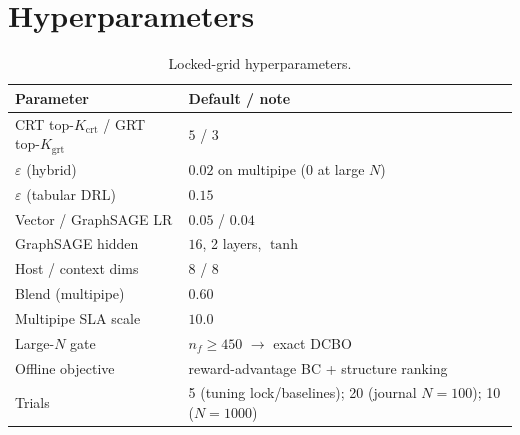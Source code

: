 \documentclass[pdflatex,sn-mathphys-num,iicol]{sn-jnl}
\begin{document}
\section{Hyperparameters}
\begin{table}[H]
\centering
\caption{Locked-grid hyperparameters.}
\label{tab:hyper}
\small
\begin{tabular}{@{}ll@{}}
\toprule
Parameter & Default / note \\
\midrule
CRT top-$K_{\mathrm{crt}}$ / GRT top-$K_{\mathrm{grt}}$ & $5$ / $3$ \\
$\varepsilon$ (hybrid) & $0.02$ on multipipe ($0$ at large $N$) \\
$\varepsilon$ (tabular DRL) & $0.15$ \\
Vector / GraphSAGE LR & $0.05$ / $0.04$ \\
GraphSAGE hidden & $16$, 2 layers, $\tanh$ \\
Host / context dims & $8$ / $8$ \\
Blend (multipipe) & $0.60$ \\
Multipipe SLA scale & $10.0$ \\
Large-$N$ gate & $n_f\ge 450$ $\rightarrow$ exact DCBO \\
Offline objective & reward-advantage BC + structure ranking \\
Trials & 5 (tuning lock/baselines); 20 (journal $N{=}100$); 10 ($N{=}1000$) \\
\bottomrule
\end{tabular}
\end{table}
\FloatBarrier
\clearpage



\end{document}
